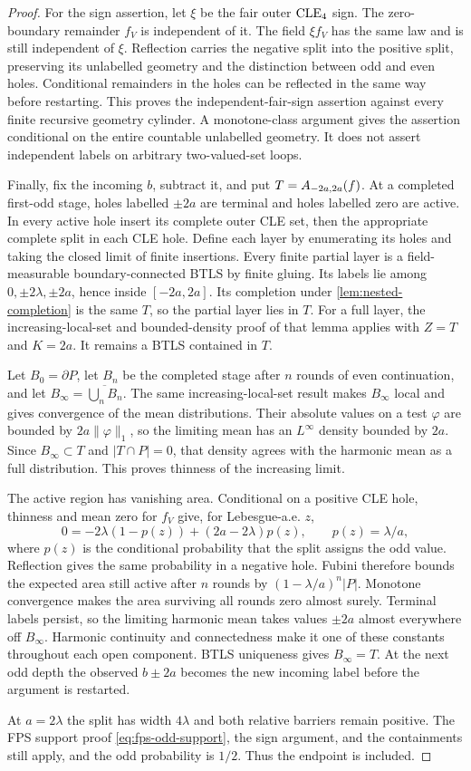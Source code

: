 \begin{proof}
For the sign assertion, let $\xi$ be the fair outer $\mathrm{CLE}_4$ sign.
The zero-boundary remainder $f_V$ is independent of it. The field
$\xi f_V$ has the same law and is still independent of $\xi$.
Reflection carries the negative split into the positive split,
preserving its unlabelled geometry and the distinction between odd
and even holes. Conditional remainders in the holes can be
reflected in the same way before restarting. This proves the
independent-fair-sign assertion against every finite recursive geometry
cylinder. A monotone-class argument gives the assertion conditional on
the entire countable unlabelled geometry. It does not assert independent
labels on arbitrary two-valued-set loops.

Finally, fix the incoming \(b\), subtract it, and put
\(T=A_{-2a,2a}(f)\). At a completed first-odd stage, holes labelled
\(\pm2a\) are terminal and holes labelled zero are active. In every
active hole insert its complete outer CLE set, then the appropriate
complete split in each CLE hole. Define each layer by enumerating its
holes and taking the closed limit of finite insertions. Every finite
partial layer is a field-measurable boundary-connected BTLS by finite
gluing. Its labels lie among \(0,\pm2\lambda,\pm2a\), hence inside
\([-2a,2a]\). Its completion under \cref{lem:nested-completion} is
the same \(T\), so the partial layer lies in \(T\). For a full layer,
the increasing-local-set and bounded-density proof of that lemma applies
with \(Z=T\) and \(K=2a\). It remains a BTLS contained in \(T\).

Let \(B_0=\partial P\), let \(B_n\) be the completed stage after \(n\)
rounds of even continuation, and
let \(B_\infty=\overline{\bigcup_n B_n}\). The same increasing-local-set
result makes \(B_\infty\) local and gives convergence of the mean
distributions. Their absolute values on a test \(\varphi\) are bounded
by \(2a\|\varphi\|_1\), so the limiting mean has an \(L^\infty\)
density bounded by \(2a\). Since \(B_\infty\subset T\) and
\(|T\cap P|=0\), that density agrees with the harmonic mean as a full
distribution. This proves thinness of the increasing limit.

The active region has vanishing area. Conditional on a positive CLE
hole, thinness and mean zero for \(f_V\) give, for Lebesgue-a.e. \(z\),
\[
 0=-2\lambda(1-p(z))+(2a-2\lambda)p(z),
 \qquad p(z)=\lambda/a,
\]
where \(p(z)\) is the conditional probability that the split assigns
the odd value. Reflection gives the same probability in a negative
hole. Fubini therefore bounds the expected area still active after
\(n\) rounds by \((1-\lambda/a)^n|P|\). Monotone convergence makes
the area surviving all rounds zero almost surely.
Terminal labels persist, so the limiting harmonic mean takes values
\(\pm2a\) almost everywhere off \(B_\infty\). Harmonic continuity and
connectedness make it one of these constants throughout each open
component. BTLS uniqueness gives \(B_\infty=T\). At the next odd
depth the observed \(b\pm2a\) becomes the new incoming label before
the argument is restarted.

At \(a=2\lambda\) the split has width \(4\lambda\) and both relative
barriers remain positive. The FPS support proof
\eqref{eq:fps-odd-support}, the sign argument, and the containments
still apply, and the odd probability is \(1/2\). Thus the endpoint is
included.
\end{proof}
